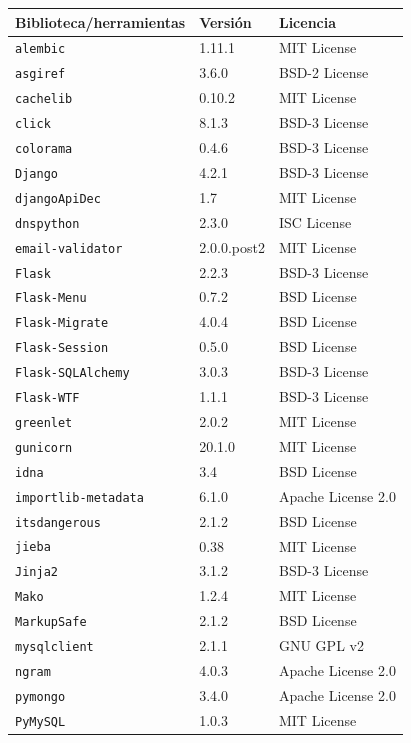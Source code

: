 \begin{table}
\centering 
\begin{tabular}{|l|p{}|p{}|}
\hline
\textbf{Biblioteca/herramientas} & \textbf{Versión} & \textbf{Licencia} \\
\hline
\texttt{alembic} & 1.11.1 & MIT License \\
\texttt{asgiref} & 3.6.0 & BSD-2 License \\
\texttt{cachelib} & 0.10.2 & MIT License \\
\texttt{click} & 8.1.3 & BSD-3 License \\
\texttt{colorama} & 0.4.6 & BSD-3 License \\
\texttt{Django} & 4.2.1 & BSD-3 License \\
\texttt{djangoApiDec} & 1.7 & MIT License \\
\texttt{dnspython} & 2.3.0 & ISC License \\
\texttt{email-validator} & 2.0.0.post2 & MIT License \\
\texttt{Flask} & 2.2.3 & BSD-3 License \\
\texttt{Flask-Menu} & 0.7.2 & BSD License \\
\texttt{Flask-Migrate} & 4.0.4 & BSD License \\
\texttt{Flask-Session} & 0.5.0 & BSD License \\
\texttt{Flask-SQLAlchemy} & 3.0.3 & BSD-3 License \\
\texttt{Flask-WTF} & 1.1.1 & BSD-3 License \\
\texttt{greenlet} & 2.0.2 & MIT License \\
\texttt{gunicorn} & 20.1.0 & MIT License \\
\texttt{idna} & 3.4 & BSD License \\
\texttt{importlib-metadata} & 6.1.0 & Apache License 2.0 \\
\texttt{itsdangerous} & 2.1.2 & BSD License \\
\texttt{jieba} & 0.38 & MIT License \\
\texttt{Jinja2} & 3.1.2 & BSD-3 License \\
\texttt{Mako} & 1.2.4 & MIT License \\
\texttt{MarkupSafe} & 2.1.2 & BSD License \\
\texttt{mysqlclient} & 2.1.1 & GNU GPL v2 \\
\texttt{ngram} & 4.0.3 & Apache License 2.0 \\
\texttt{pymongo} & 3.4.0 & Apache License 2.0 \\
\texttt{PyMySQL} & 1.0.3 & MIT License \\

\end{tabular}
\end{table}
